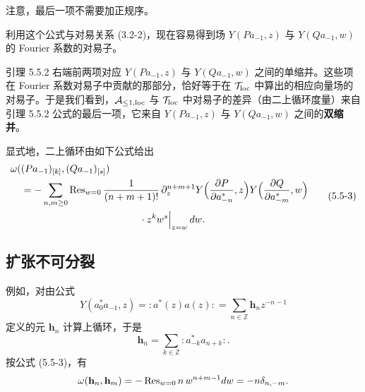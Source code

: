 注意，最后一项不需要加正规序。

利用这个公式与对易关系 (3.2-2)，现在容易得到场 $Y(Pa_{-1},z)$ 与 $Y(Qa_{-1},w)$ 的 Fourier 系数的对易子。

引理 5.5.2 右端前两项对应 $Y(Pa_{-1},z)$ 与 $Y(Qa_{-1},w)$ 之间的单缩并。这些项在 Fourier 系数对易子中贡献的那部分，恰好等于在 $\mathcal{T}_{\mathrm{loc}}$ 中算出的相应向量场的对易子。于是我们看到，$\mathcal{A}_{\le1,\mathrm{loc}}$ 与 $\mathcal{T}_{\mathrm{loc}}$ 中对易子的差异（由二上循环度量）来自引理 5.5.2 公式的最后一项，它来自 $Y(Pa_{-1},z)$ 与 $Y(Qa_{-1},w)$ 之间的\textbf{双缩并}。

显式地，二上循环由如下公式给出
\begin{equation}
\begin{aligned}
\omega(&(Pa_{-1})_{[k]},(Qa_{-1})_{[s]})\\
&=-\sum_{n,m\ge 0}\operatorname{Res}_{w=0}\frac{1}{(n+m+1)!}\,
\partial_z^{n+m+1}Y\Big(\frac{\partial P}{\partial a^*_{-n}},z\Big)Y\Big(\frac{\partial Q}{\partial a^*_{-m}},w\Big)\\
&\qquad\qquad\qquad\qquad\qquad\qquad\cdot z^kw^s\Big|_{z=w}\,dw.
\end{aligned}
\tag{5.5-3}
\end{equation}

\subsection{扩张不可分裂}

例如，对由公式
\[
Y(a^*_0a_{-1},z) = {:}a^*(z)a(z){:} = \sum_{n\in\mathbb{Z}}\mathbf{h}_n z^{-n-1}
\]
定义的元 $\mathbf{h}_n$ 计算上循环，于是
\[
\mathbf{h}_n = \sum_{k\in\mathbb{Z}}{:}a^*_{-k}a_{n+k}{:}.
\]
按公式 (5.5-3)，有
\[
\omega(\mathbf{h}_n,\mathbf{h}_m) = -\operatorname{Res}_{w=0}n\,w^{n+m-1}dw = -n\delta_{n,-m}.
\]


